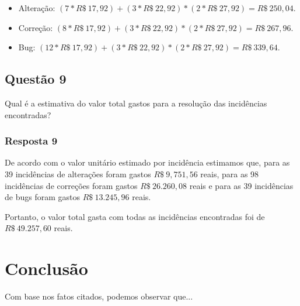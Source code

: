 \documentclass[11pt, a4paper]{article}
\begin{document}
\begin{itemize}
	\item Alteração: $(7 * R\$~17,92) +  (3 * R\$~22,92) * (2 * R\$~27,92) = R\$~250,04$.
	\item Correção: $(8 * R\$~17,92) +  (3 * R\$~22,92) * (2 * R\$~27,92) = R\$~267,96$.
	\item Bug: $(12 * R\$~17,92) +  (3 * R\$~22,92) * (2 * R\$~27,92) = R\$~339,64$.
\end{itemize}

\subsection{Questão 9}\label{sec:questao-9}
Qual é a estimativa do valor total gastos para a resolução das incidências encontradas?

\subsubsection{Resposta 9}
De acordo com o valor unitário estimado por incidência estimamos que, para as 39 incidências de alterações foram gastos $R\$~9,751,56$ reais, para as 98 incidências de correções foram gastos $R\$~26.260,08$ reais e para as 39 incidências de bugs foram gastos $R\$~13.245,96$ reais.

Portanto, o valor total gasta com todas as incidências encontradas foi de  $R\$~49.257,60$ reais.

\section{Conclusão}
Com base nos fatos citados, podemos observar que...


\end{document}
